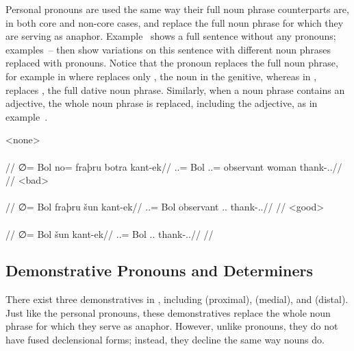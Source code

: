 Personal pronouns are used the same way their full noun phrase counterparts are, in both core and non-core cases, and replace the full noun phrase for which they are serving as anaphor. Example~ shows a full sentence without any pronouns; examples~– then show variations on this sentence with different noun phrases replaced with pronouns. Notice that the pronoun replaces the full noun phrase, for example in  where   replaces only  , the noun in the genitive, whereas in ,   replaces  , the full dative noun phrase. Similarly, when a noun phrase contains an adjective, the whole noun phrase is replaced, including the adjective, as in example~.

	\a<none>\begingl
		\glpreamble{}\\
		\\
		//
		\gla ∅= Bol no= fraþru botra kant-ek//
		\glb \An.\Sg.\Abs= Bol \An.\Sg.\Top= observant woman thank-\Ind.\Pst.\Ipfv//
		\glft{}//
	\endgl
	\a<bad>\begingl
		\glpreamble\ljudge{\ungr}\\
		\ljudge{\ungr}\\
		//
		\gla ∅= Bol fraþru šun kant-ek//
		\glb \An.\Sg.\Abs= Bol observant \Tps.\An.\Top{} thank-\Ind.\Pst.\Ipfv//
		\glft\ljudge{\ungr}//
	\endgl
	\a<good>\begingl
		\glpreamble{}\\
		\\
		//
		\gla ∅= Bol šun kant-ek//
		\glb \An.\Sg.\Abs= Bol \Tps.\An.\Top{} thank-\Ind.\Pst.\Ipfv//
		\glft{}//
	\endgl
\xe

\subsection{Demonstrative Pronouns and Determiners}
\label{subsec:tvk-demonstrative-pronouns-determiners}

There exist three demonstratives in \langtvk, including     (proximal),     (medial), and     (distal). Just like the personal pronouns, these demonstratives replace the whole noun phrase for which they serve as anaphor. However, unlike pronouns, they do not have fused declensional forms; instead, they decline the same way nouns do.

